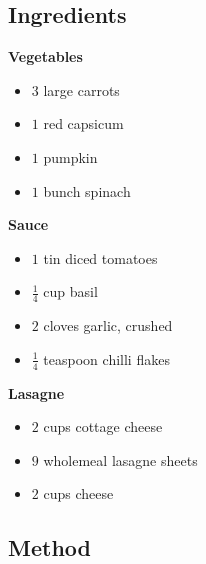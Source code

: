 \documentclass[11pt,a4paper]{article}
\begin{document}
\subsection*{Ingredients}

\begin{multicols}{3}

\textbf{Vegetables}

\begin{itemize}
  \item $ 3 $ large carrots
  \item $ 1 $ red capsicum
  \item $ 1 $ pumpkin
  \item $ 1 $ bunch spinach
\end{itemize}

\columnbreak

\textbf{Sauce}

\begin{itemize}
\item $ 1 $ tin diced tomatoes
\item $ \frac {1} {4} $ cup basil
\item $ 2 $ cloves garlic, crushed
\item $ \frac {1} {4} $ teaspoon chilli flakes
\end{itemize}

\columnbreak

\textbf{Lasagne}

\begin{itemize}
\item $ 2 $ cups cottage cheese
\item $ 9 $ wholemeal lasagne sheets
\item $ 2 $ cups cheese
\end{itemize}

\end{multicols}

\medskip

\subsection*{Method}
\end{document}
